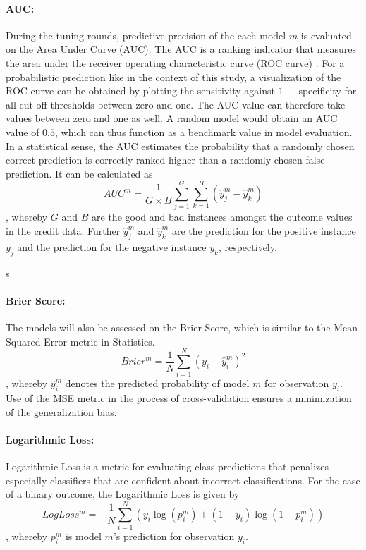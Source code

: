 \documentclass[12pt]{article}
\begin{document}
\paragraph{AUC:} During the tuning rounds, predictive precision of the each model $m$ is evaluated on the Area Under Curve (AUC). The AUC is a ranking indicator that measures the area under the receiver operating characteristic curve (ROC curve) \citep{hanley1982meaning}. For a probabilistic prediction like in the context of this study, a visualization of the ROC curve can be obtained by plotting the sensitivity against $1 -$ specificity for all cut-off thresholds between zero and one. The AUC value can therefore take values between zero and one as well. A random model would obtain an AUC value of $0.5$, which can thus function as a benchmark value in model evaluation. In a statistical sense, the AUC estimates the probability that a randomly chosen correct prediction is correctly ranked higher than a randomly chosen false prediction. It can be calculated as
\begin{equation}
AUC^m = \frac{1}{G \times B}\sum_{j=1}^{G}\sum_{k=1}^{B}(\hat{y}^m_j - \hat{y}^m_k)
\end{equation}
, whereby $G$ and $B$ are the good and bad instances amongst the outcome values in the credit data. Further $\hat{y}^m_j$ and $\hat{y}^m_k$ are the prediction for the positive instance $y_j$ and the prediction for the negative instance $y_k$, respectively.

s\paragraph{Brier Score:}The models will also be assessed on the Brier Score, which is similar to the Mean Squared Error metric in Statistics.
\begin{equation}
Brier^m = \frac{1}{N}\sum_{i=1}^{N}(y_i - \hat{y}^m_i)^2
\end{equation}
, whereby $\hat{y}^m_i$ denotes the predicted probability of model $m$ for observation $y_i$. Use of the MSE metric in the process of cross-validation ensures a minimization of the generalization bias. 

\paragraph{Logarithmic Loss:} Logarithmic Loss is a metric for evaluating class predictions that penalizes especially classifiers that are confident about incorrect classifications. For the case of a binary outcome, the Logarithmic Loss is given by\\
\begin{equation}
LogLoss^m = - \frac{1}{N}\sum_{i=1}^{N}(y_i\log(p^m_i) + (1 - y_i)\log(1 - p^m_i))
\end{equation}
, whereby $p^m_i$ is model $m$'s prediction for observation $y_i$.
\end{document}
